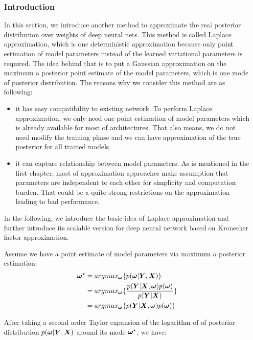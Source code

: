 \subsubsection{Introduction}
In this section, we introduce another method to approximate the real posterior distribution over weights of deep neural nets. This method is called Laplace approximation\cite{bishop2006pattern}, which is one deterministic approximation because only point estimation of model parameters instead of the learned variational parameters is required. The idea behind that is to put a Gaussian approximation on the maximum a posterior point estimate of the model parameters, which is one mode of posterior distribution. The reasons why we consider this method are as following:
\begin{itemize}
	\item it has easy compatibility to existing network. To perform Laplace approximation, we only need one point estimation of model parameters which is already available for most of architectures. That also means, we do not need modify the training phase and we can have approximation of the true posterior for all trained models.
	\item it can capture relationship between model parameters. As is mentioned in the first chapter, most of approximation approaches make assumption that parameters are independent to each other for simplicity and computation burden. That could be a quite strong restrictions on the approximation leading to bad performance.
\end{itemize}

In the following, we introduce the basic idea of Laplace approximation and further introduce its scalable version for deep neural network based on Kronecker factor approximation.

Assume we have a point estimate of model parameters via maximum a posterior estimation:
\begin{equation}
\begin{aligned} \label{point estimate}
\boldsymbol \omega^\star &= argmax_{\boldsymbol \omega}\{p(\boldsymbol \omega|\boldsymbol Y,\boldsymbol X)\} \\
&= argmax_{\boldsymbol \omega}\{\frac{p(\boldsymbol Y|\boldsymbol X, \boldsymbol \omega) p(\boldsymbol \omega)}{p(\boldsymbol Y | \boldsymbol X)}\} \\
&= argmax_{\boldsymbol \omega}\{p(\boldsymbol Y|\boldsymbol X, \boldsymbol \omega) p(\boldsymbol \omega)\}
\end{aligned}
\end{equation}


After taking a second order Taylor expansion of the logarithm of of posterior distribution $p(\boldsymbol \omega | \boldsymbol Y, \boldsymbol X)$ around its mode $\boldsymbol \omega^\star$, we have:

